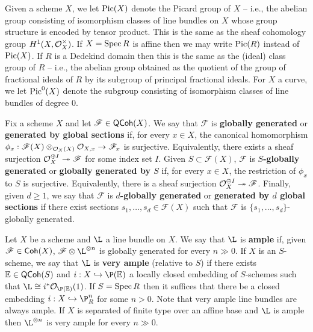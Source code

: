 \documentclass[11pt]{article}
\newcommand{\F}{\mathscr{F}}
\begin{document}
Given a scheme $X$, we let $\operatorname{Pic}(X)$ denote the Picard group of $X$ -- i.e., the abelian group consisting of isomorphism classes of line bundles on $X$ whose group structure is encoded by tensor product. This is the same as the sheaf cohomology group $H^1(X,\mathcal{O}_X^{\times})$. If $X=\operatorname{Spec} R$ is affine then we may write $\operatorname{Pic}(R)$ instead of $\operatorname{Pic}(X)$. If $R$ is a Dedekind domain then this is the same as the (ideal) class group of $R$ -- i.e., the abelian group obtained as the quotient of the group of fractional ideals of $R$ by its subgroup of principal fractional ideals. For $X$ a curve, we let $\operatorname{Pic}^0(X)$ denote the subgroup consisting of isomorphism classes of line bundles of degree $0$.

Fix a scheme $X$ and let $\F\in\QCoh(X)$. We say that $\F$ is \textbf{globally generated} or \textbf{generated by global sections} if, for every $x\in X$, the canonical homomorphism $\phi_x: \F(X)\tensor_{\O_X(X)}\O_{X,x}\to\F_x$ is surjective. Equivalently, there exists a sheaf surjection $\O_X^{\oplus I}\surj\F$ for some index set $I$. Given $S\subset\F(X)$, $\F$ is \textbf{$S$-globally generated} or \textbf{globally generated by $S$} if, for every $x\in X$, the restriction of $\phi_x$ to $S$ is surjective. Equivalently, there is a sheaf surjection $\O_X^{\oplus I}\surj\F$. Finally, given $d\geq1$, we say that $\F$ is \textbf{$d$-globally generated} or \textbf{generated by $d$ global sections} if there exist sections $s_1,\ldots,s_d\in\F(X)$ such that $\F$ is $\{s_1,\ldots,s_d\}$-globally generated.

Let $X$ be a scheme and $\L$ a line bundle on $X$. We say that $\L$ is \textbf{ample} if, given $\F\in\Coh(X)$, $\F\tensor\L^{\tensor n}$ is globally generated for every $n\gg0$. If $X$ is an $S$-scheme, we say that $\L$ is \textbf{very ample} (relative to $S$) if there exists $\mathbb{E}\in\operatorname{\mathsf{QCoh}}(S)$ and $i: X\inj\P(\E)$ a locally closed embedding of $S$-schemes such that $\L\iso i^*\O_{\P(\E)}(1)$. If $S=\operatorname{Spec} R$ then it suffices that there be a closed embedding $i: X\inj\P_R^n$ for some $n>0$. Note that very ample line bundles are always ample. If $X$ is separated of finite type over an affine base and $\L$ is ample then $\L^{\tensor n}$ is very ample for every $n\gg0$.
\end{document}
